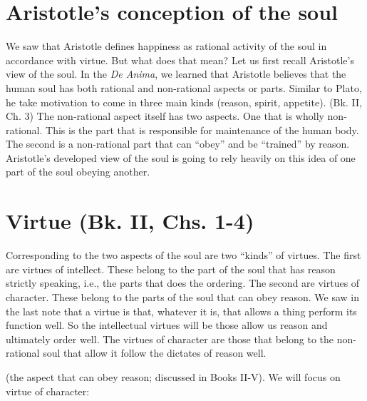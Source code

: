 \documentclass[oneside]{article}
\begin{document}
\thispagestyle{fancy}

\section*{Aristotle's conception of the soul}
We saw that Aristotle defines happiness as rational activity of the soul in accordance with virtue. But what does that mean? Let us first recall Aristotle's view of the soul. In the \emph{De Anima}, we learned that Aristotle believes that the human soul has both rational and non-rational aspects or parts. Similar to Plato, he take motivation to come in three main kinds (reason, spirit, appetite).  (Bk. II, Ch. 3)
The non-rational aspect itself has two aspects. One that is wholly non-rational. This is the part that is responsible for maintenance of the human body. The second is a non-rational part that can ``obey'' and be ``trained'' by reason. Aristotle's developed view of the soul is going to rely heavily on this idea of one part of the soul obeying another. 

\section*{Virtue (Bk. II, Chs. 1-4)}

Corresponding to the two aspects of the soul are two ``kinds'' of virtues. The first are virtues of intellect. These belong to the part of the soul that has reason strictly speaking, i.e., the parts that does the ordering. The second are virtues of character. These belong to the parts of the soul that can obey reason. We saw in the last note that a virtue is that, whatever it is, that allows a thing perform its function well. So the intellectual virtues will be those allow us reason and ultimately order well. The virtues of character are those that belong to the non-rational soul that allow it follow the dictates of reason well.  

 (the aspect that can obey reason; discussed in Books II-V). We will focus on virtue of character: 
\end{document}
